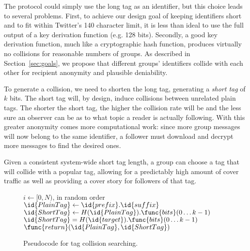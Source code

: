 The \hoot protocol could simply use the long tag as an identifier, but
this choice leads to several problems. First, to achieve our design goal
of keeping identifiers short and to fit within Twitter's 140 character
limit, it is less than ideal to use the full output of a key derivation
function (e.g. 128 bits). Secondly, a good key derivation function, much
like a cryptographic hash function, produces virtually no collisions for
reasonable numbers of groups. As described in Section~\ref{sec:goals},
we propose that different groups' identifiers collide with each other
for recipient anonymity and plausible deniability.

To generate a collision, we need to shorten the long tag, generating a
\textit{short tag} of $k$ bits. The short tag will, by design, induce
collisions between unrelated plain tags. The shorter the short tag, the
higher the collision rate will be and the less sure an observer can be
as to what topic a \hoot reader is actually following. With this greater
anonymity comes more computational work: since more group messages will
now belong to the same identifier, a follower must download and decrypt
more messages to find the desired ones.

Given a consistent system-wide short tag length, a group can choose a
tag that will collide with a popular tag, allowing for a predictably
high amount of cover traffic as well as providing a cover story for
followers of that tag.
%
\begin{figure}
\begin{codebox}
\zi \For $i \gets [0,N)$, in random order
\zi \Do
\zi $\id{PlainTag} \gets  \id{prefix}.\id{suffix}$
\zi $\id{ShortTag} \gets H(\id{PlainTag}).\func{bits}(0 \ldots k-1)$
\zi \If $\id{ShortTag} = H(\id{target}).\func{bits}(0 \ldots k-1)$
\zi \Then $\func{return} (\id{PlainTag} , \id{ShortTag})$
\zi \End
\End
\end{codebox}
\caption{Pseudocode for tag collision searching.\label{fig:find-tag}}
\end{figure}

